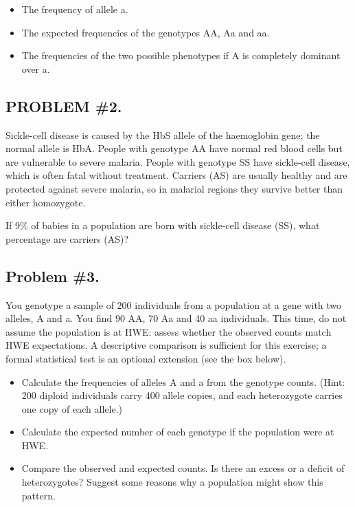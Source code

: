 \documentclass[
  a4paper]{book}
\providecommand{\tightlist}{%
  \setlength{\itemsep}{0pt}\setlength{\parskip}{0pt}}
\begin{document}
\begin{itemize}
\tightlist
\item
  The frequency of allele a.
\item
  The expected frequencies of the genotypes AA, Aa and aa.
\item
  The frequencies of the two possible phenotypes if A is completely dominant over a.
\end{itemize}

\subsection{PROBLEM \#2.}\label{problem-2.}

Sickle-cell disease is caused by the HbS allele of the haemoglobin gene; the normal allele is HbA. People with genotype AA have normal red blood cells but are vulnerable to severe malaria. People with genotype SS have sickle-cell disease, which is often fatal without treatment. Carriers (AS) are usually healthy and are protected against severe malaria, so in malarial regions they survive better than either homozygote.

If 9\% of babies in a population are born with sickle-cell disease (SS), what percentage are carriers (AS)?

\subsection{Problem \#3.}\label{problem-3.}

You genotype a sample of 200 individuals from a population at a gene with two alleles, A and a. You find 90 AA, 70 Aa and 40 aa individuals. This time, do not assume the population is at HWE: assess whether the observed counts match HWE expectations. A descriptive comparison is sufficient for this exercise; a formal statistical test is an optional extension (see the box below).

\begin{itemize}
\tightlist
\item
  Calculate the frequencies of alleles A and a from the genotype counts. (Hint: 200 diploid individuals carry 400 allele copies, and each heterozygote carries one copy of each allele.)
\item
  Calculate the expected number of each genotype if the population were at HWE.
\item
  Compare the observed and expected counts. Is there an excess or a deficit of heterozygotes? Suggest some reasons why a population might show this pattern.
\end{itemize}
\end{document}
